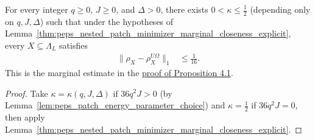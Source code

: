 \begin{lemma}
    \label{thm:peps_nested_patch_minimizer_marginal_closeness}
    \leanok
    For every integer $q\ge0$, $J\ge0$, and $\Delta>0$, there exists $0<\kappa\le\tfrac12$ (depending only on $q,J,\Delta$) such that under the hypotheses of Lemma~\ref{thm:peps_nested_patch_minimizer_marginal_closeness_explicit}, every $X\subseteq\Lambda_L$ satisfies
    \begin{align}
        \|\rho_X-\rho_X^{U\Omega}\|_1 & \le\frac1{16}.
        \label{eq:peps_nested_patch_marginal_closeness}
    \end{align}
    This is the marginal estimate in the
    \href{https://github.com/openai/math/blob/adc7f1241b42e322a6451854ab7e4b4c146bf78a/preprints/Polynomial-PEPS-approximation-of-gapped-square-grid-ground-states-September-24-2026/build/sections/03-patches.tex\#L335-L365}{proof of Proposition 4.1}.
\end{lemma}
\begin{proof}
    \leanok
    Take $\kappa=\kappa(q,J,\Delta)$ if $36q^2J>0$ (by Lemma~\ref{lem:peps_patch_energy_parameter_choice}) and $\kappa=\tfrac12$ if $36q^2J=0$, then apply Lemma~\ref{thm:peps_nested_patch_minimizer_marginal_closeness_explicit}.
\end{proof}

